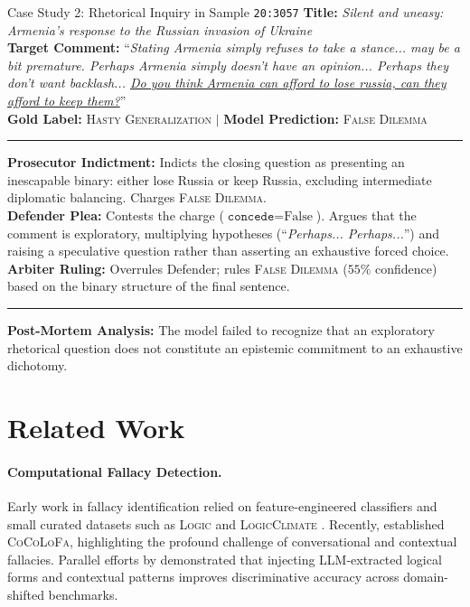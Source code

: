 \documentclass[11pt]{article}
\begin{document}
\begin{dialoguebox}{Case Study 2: Rhetorical Inquiry in Sample \texttt{20:3057}}
\textbf{Title:} \textit{Silent and uneasy: Armenia’s response to the Russian invasion of Ukraine} \\
\textbf{Target Comment:} ``\textit{Stating Armenia simply refuses to take a stance... may be a bit premature. Perhaps Armenia simply doesn't have an opinion... Perhaps they don't want backlash... \underline{Do you think Armenia can afford to lose russia, can they afford to keep them?}}'' \\
\textbf{Gold Label:} \textsc{Hasty Generalization} $\mid$ \textbf{Model Prediction:} \textsc{False Dilemma}

\vspace{1mm}\hrule\vspace{1mm}
\textbf{Prosecutor Indictment:} Indicts the closing question as presenting an inescapable binary: either lose Russia or keep Russia, excluding intermediate diplomatic balancing. Charges \textsc{False Dilemma}. \\
\textbf{Defender Plea:} Contests the charge ($\texttt{concede} = \text{False}$). Argues that the comment is exploratory, multiplying hypotheses (``\textit{Perhaps... Perhaps...}'') and raising a speculative question rather than asserting an exhaustive forced choice. \\
\textbf{Arbiter Ruling:} Overrules Defender; rules \textsc{False Dilemma} ($55\%$ confidence) based on the binary structure of the final sentence.

\vspace{1mm}\hrule\vspace{1mm}
\textbf{Post-Mortem Analysis:} The model failed to recognize that an exploratory rhetorical question does not constitute an epistemic commitment to an exhaustive dichotomy.
\end{dialoguebox}

\section{Related Work}

\paragraph{Computational Fallacy Detection.}
Early work in fallacy identification relied on feature-engineered classifiers and small curated datasets such as \textsc{Logic} \cite{jin2022logical} and \textsc{LogicClimate} \cite{schuetz2022}. Recently, \citet{cocolofa2024} established \textsc{CoCoLoFa}, highlighting the profound challenge of conversational and contextual fallacies. Parallel efforts by \citet{papadopulos2026} demonstrated that injecting LLM-extracted logical forms and contextual patterns improves discriminative accuracy across domain-shifted benchmarks.
\end{document}
